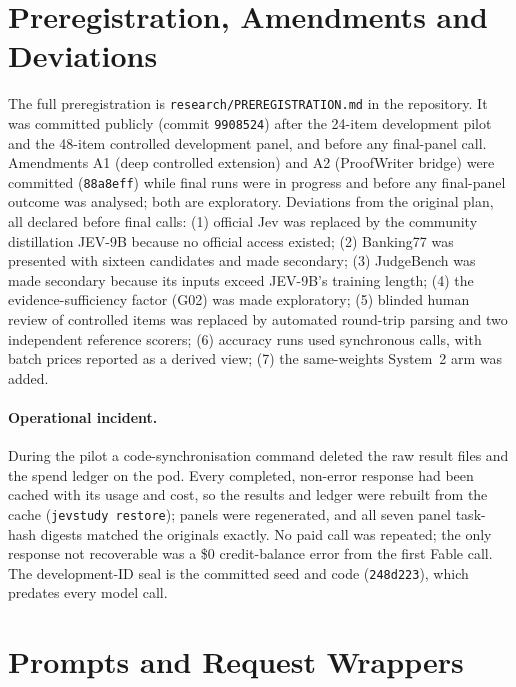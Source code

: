 \section{Preregistration, Amendments and Deviations}
\label{app:prereg}
The full preregistration is \texttt{research/PREREGISTRATION.md} in the repository.
It was committed publicly (commit \texttt{9908524}) after the 24-item development pilot and the 48-item controlled development panel, and before any final-panel call.
Amendments A1 (deep controlled extension) and A2 (ProofWriter bridge) were committed (\texttt{88a8eff}) while final runs were in progress and before any final-panel outcome was analysed; both are exploratory.
Deviations from the original plan, all declared before final calls:
(1) official Jev was replaced by the community distillation JEV-9B because no official access existed;
(2) Banking77 was presented with sixteen candidates and made secondary;
(3) JudgeBench was made secondary because its inputs exceed JEV-9B's training length;
(4) the evidence-sufficiency factor (G02) was made exploratory;
(5) blinded human review of controlled items was replaced by automated round-trip parsing and two independent reference scorers;
(6) accuracy runs used synchronous calls, with batch prices reported as a derived view;
(7) the same-weights System~2 arm was added.

\paragraph{Operational incident.}
During the pilot a code-synchronisation command deleted the raw result files and the spend ledger on the pod.
Every completed, non-error response had been cached with its usage and cost, so the results and ledger were rebuilt from the cache (\texttt{jevstudy restore}); panels were regenerated, and all seven panel task-hash digests matched the originals exactly.
No paid call was repeated; the only response not recoverable was a \$0 credit-balance error from the first Fable call.
The development-ID seal is the committed seed and code (\texttt{248d223}), which predates every model call.

\section{Prompts and Request Wrappers}
\label{app:prompts}
